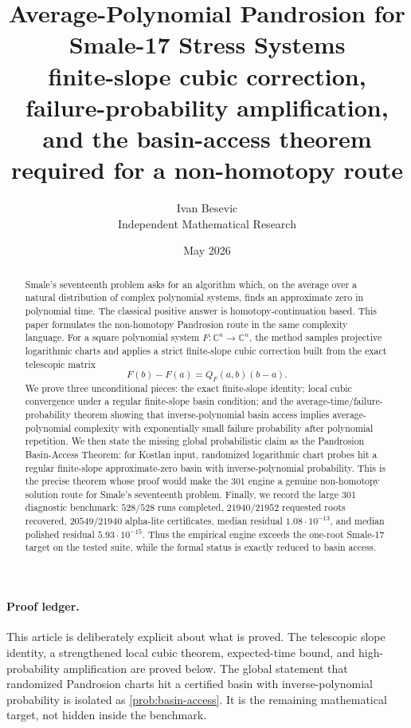 \documentclass[11pt]{article}
\title{Average-Polynomial Pandrosion for Smale-17 Stress Systems\\[3pt]
\large finite-slope cubic correction, failure-probability amplification, and the basin-access theorem required for a non-homotopy route}
\author{Ivan Besevic\\Independent Mathematical Research}
\date{May 2026}
\newcommand{\C}{\mathbb C}
\begin{document}
\maketitle

\begin{abstract}
Smale's seventeenth problem asks for an algorithm which, on the average over a natural distribution of complex polynomial systems, finds an approximate zero in polynomial time.  The classical positive answer is homotopy-continuation based.  This paper formulates the non-homotopy Pandrosion route in the same complexity language.  For a square polynomial system $F:\C^n\to\C^n$, the method samples projective logarithmic charts and applies a strict finite-slope cubic correction built from the exact telescopic matrix
\[
        F(b)-F(a)=Q_F(a,b)(b-a).
\]
We prove three unconditional pieces: the exact finite-slope identity; local cubic convergence under a regular finite-slope basin condition; and the average-time/failure-probability theorem showing that inverse-polynomial basin access implies average-polynomial complexity with exponentially small failure probability after polynomial repetition.  We then state the missing global probabilistic claim as the Pandrosion Basin-Access Theorem: for Kostlan input, randomized logarithmic chart probes hit a regular finite-slope approximate-zero basin with inverse-polynomial probability.  This is the precise theorem whose proof would make the 301 engine a genuine non-homotopy solution route for Smale's seventeenth problem.  Finally, we record the large 301 diagnostic benchmark: $528/528$ runs completed, $21940/21952$ requested roots recovered, $20549/21940$ alpha-lite certificates, median residual $1.08\cdot10^{-13}$, and median polished residual $5.93\cdot10^{-15}$.  Thus the empirical engine exceeds the one-root Smale-17 target on the tested suite, while the formal status is exactly reduced to basin access.
\end{abstract}

\paragraph{Proof ledger.}
This article is deliberately explicit about what is proved.  The telescopic slope identity, a strengthened local cubic theorem, expected-time bound, and high-probability amplification are proved below.  The global statement that randomized Pandrosion charts hit a certified basin with inverse-polynomial probability is isolated as \cref{prob:basin-access}.  It is the remaining mathematical target, not hidden inside the benchmark.
\end{document}

